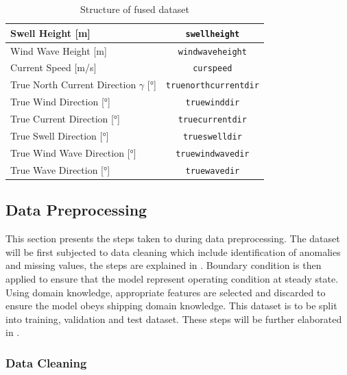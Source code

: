 \begin{table}
{\begin{tabular}{ |p{8cm}|c| }
    \hline
    Swell Height [m] & {\tt swellheight}\\
    \hline
    Wind Wave Height [m] & {\tt windwaveheight}  \\
    \hline
    Current Speed [m/s] & {\tt curspeed} \\
    \hline
    True North Current Direction $\gamma$ [°] & {\tt truenorthcurrentdir}\\
    \hline
    True Wind Direction [°] & {\tt truewinddir}  \\
    \hline
    True Current Direction [°] & {\tt truecurrentdir} \\
    \hline
    True Swell Direction [°] & {\tt trueswelldir} \\
    \hline
    True Wind Wave Direction [°] & {\tt truewindwavedir} \\
    \hline
    True Wave Direction [°] & {\tt truewavedir} \\
    \hline
    \end{tabular}}
\caption{Structure of fused dataset}\label{dataset_init_struct}
\end{table}

\subsection{Data Preprocessing}\label{data_prep}

This section presents the steps taken to during data preprocessing. The dataset will be first subjected to data cleaning which include identification of anomalies and missing values, the steps are explained in . Boundary condition is then applied to ensure that the model represent operating condition at steady state. Using domain knowledge, appropriate features are selected and discarded to ensure the model obeys shipping domain knowledge. This dataset is to be split into training, validation and test dataset. These steps will be further elaborated in .

\subsubsection{Data Cleaning}\label{data_cleaning}

